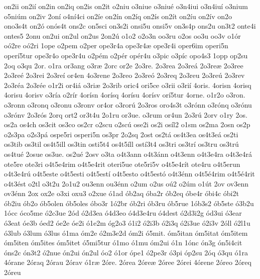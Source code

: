 {on2ii
on2i^^ed
on2in
on2iq
on2is
on2it
o2niu
o3niue
o3niu^^e9
o3n4iui
o3n4iu^^ed
o3nium
o5ni^^fam
on2iv
2on^^ed
o4n^^ed4ci
on2^^ede
on2^^edn
on2^^edq
on2^^eds
on2^^edt
on2^^edu
on2^^edv
on2o
ono3s4t
on2^^f3
on^^f3s4t
ons2c
on5sci
on3s2i
onsi5u
onsi5v
on3s4p
ons2u
on3t2
onte4i
ontes5
2onu
on2ui
on2ul
on2us
2on2^^fa
o1o2
o2o3n
oo3ru
o2os
oo3u
oo3v
o1^^f3r
o^^f32re
o^^f32ri
1ope
o2pem
o2per
ope3r4a
ope3r4^^e6
ope3r4i
oper6im
operi5n
oper^^ed5tur
ope3r4o
ope3r4u
o2p^^e9m
o2p^^e9r
op^^e9r4u
o3pic
o3p^^edc
opo4s3
1opp
op2su
2oq
o3qu
2or.
o1ra
or3ang
o3r^^e6
2orc
or2e
2o3re.
2o3rea
2o3re^^e1
2o3re^^e6
2o3ree
2o3re^^e9
2o3rei
2o3re^^ed
or4en
4o3rene
2o3reo
2o3re^^f3
2o3req
2o3reu
2o3re^^fa
2o3rev
2o3r^^e9a
2o3r^^e9e
o1r2i
or4i^^e1
o3ri^^e6
2o3rib
oric4
ori5ce
o3rii
o3ri^^ed
4oris.
4orisn
4orisq
4orisu
4orisv
o3r^^eda
o2r^^edr
4or^^edsn
4or^^edsq
4or^^edsu
4or^^edsv
or^^ed5tur
4orne.
o1r2o
o3ron.
o3ronn
o3ronq
o3ronu
o3ronv
or4or
o3ror^^fa
2o3ros
oro4s3t
o3r^^f3nn
o3r^^f3nq
o3r^^f3nu
o3r^^f3nv
2o3r^^f3s
2orq
ort2
or3t4u
2o1ru
or3ue.
o3rum
or4un
2o3r^^fa
2orv
o1ry
2os.
os2a
os4ch
os3cit
os3co
os2cr
o2scu
o2sc^^fa
ose2i
os2i
os^^edl2
o1sm
os2ma
2osn
os2p
o2s3pa
o2s3p^^e1
ospe5ri
osperi5n
os3pr
2o2sq
2ost
os2t^^e1
os4t3ea
os4t3e^^e1
os2ti
os3tib
os3til
os4t5ill
os3tin
osti5t4
os4t5^^edll
ost^^ed3t4
os3tri
os3tr^^ed
os3tru
os3tr^^fa
os4tu^^e9
2osue
os3ue.
os2u^^e9
2osv
o3ta
o4t3ann
o4t3^^e1nn
o4t3enn
o4t3e4ra
o4t3e4r^^e1
ote5re
ote3ri
o4t5e4rim
o4t5e4rit
oteri5ue
ote5ri5v
o4t5e4r^^edt
ote4ru
o4t5erun
o4t3e4r^^fa
o4t5este
o4t5esti
o4t5est^^ed
o4t5esto
o4t5est^^f3
o4t3^^e9nn
o4t5^^e94rim
o4t5^^e94rit
o4t3^^e9st
o2tl
o3t2u
2o1u2
ou3enn
ou3^^e9nn
o2um
o2us
o^^fa2
o2^^fam
o1^^fat
2ov
ov3enn
ov3^^e9nn
2ox
ox2e
o3xi
oxu3
o2xue
^^f31ad
^^f3b2aq
^^f3ba2r
^^f3b2eq
^^f3be4r
^^f3bi4c
^^f3bi2t
^^f3b2iu
^^f3b2o
^^f3b5olen
^^f3b5oles
^^f3bo3r
1^^f32br
^^f3b2ri
^^f3b3ru
^^f3b5rue
1^^f3b3s2
^^f3b5ste
^^f33b2u
1^^f3cc
^^f3co5me
^^f32c3ue
2^^f3d
^^f32d3ea
^^f34d3eo
^^f34d3e4ru
^^f34dest
^^f32d3i2g
^^f3d3ui
^^f33ear
^^f33eat
^^f3e3b
^^f3ed2
^^f3e2e
^^f3e2i
^^f31e2m
^^f3g2o3
^^f31i2
^^f32i3b
^^f32i3q
^^f32i3ue
^^f32i3v
2^^f3ll
^^f32l1u
^^f33lub
^^f33lum
^^f33lus
^^f31ma
^^f3m2e
^^f32m3e2d
^^f3m2i
^^f35mit.
^^f3m5itan
^^f3m5itat
^^f3m5item
^^f3m5iten
^^f3m5ites
^^f3m5itet
^^f35mi5tur
^^f31mo
^^f31mu
^^f3m2ui
^^f31n
1^^f3nc
^^f3n3g
^^f3n5i4cit
^^f3ns2c
^^f3n3t2
^^f32nue
^^f3n2ui
^^f3n2ul
^^f3o2
^^f31or
^^f3pe1
^^f32pe3r
^^f33pi
^^f3p2su
2^^f3q
^^f33qu
^^f31ra
4^^f3rane
2^^f3raq
2^^f3rau
2^^f3rav
^^f31r^^e6
2^^f3re.
2^^f3rea
2^^f3re^^e6
2^^f3ree
2^^f3rei
4^^f3rene
2^^f3reo
2^^f3req
2^^f3reu
}
